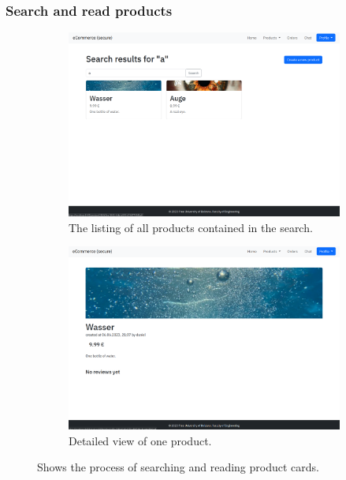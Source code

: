 \documentclass[conference,onecolumn,a4paper]{IEEEtran}
\begin{document}
\subsubsection{Search and read products}

\begin{figure}[H]
    \centering
    \begin{subfigure}[b]{0.4\linewidth}
        \includegraphics[width=\linewidth]{resources/seach-product.png}
        \caption{The listing of all products contained in the search.}
    \end{subfigure}
    \begin{subfigure}[b]{0.4\linewidth}
        \includegraphics[width=\linewidth]{resources/product.png}
        \caption{Detailed view of one product.}
    \end{subfigure}
    \caption{Shows the process of searching and reading product cards.}
\end{figure}
\end{document}
